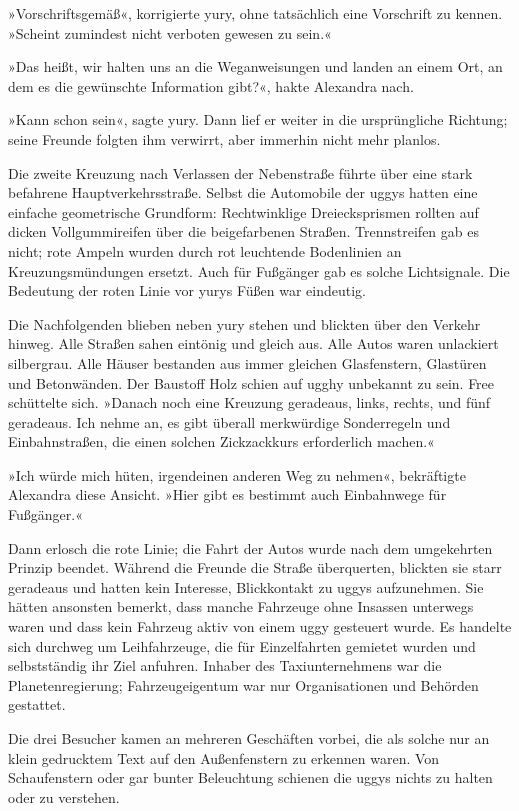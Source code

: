 »Vorschriftsgemäß«, korrigierte yury, ohne tatsächlich eine Vorschrift zu kennen. »Scheint zumindest nicht verboten gewesen zu sein.«

»Das heißt, wir halten uns an die Weganweisungen und landen an einem Ort, an dem es die gewünschte Information gibt?«, hakte Alexandra nach.

»Kann schon sein«, sagte yury. Dann lief er weiter in die ursprüngliche Richtung; seine Freunde folgten ihm verwirrt, aber immerhin nicht mehr planlos.

Die zweite Kreuzung nach Verlassen der Nebenstraße führte über eine stark befahrene Hauptverkehrsstraße. Selbst die Automobile der uggys hatten eine einfache geometrische Grundform: Rechtwinklige Dreiecksprismen rollten auf dicken Vollgummireifen über die beigefarbenen Straßen. Trennstreifen gab es nicht; rote Ampeln wurden durch rot leuchtende Bodenlinien an Kreuzungsmündungen ersetzt. Auch für Fußgänger gab es solche Lichtsignale. Die Bedeutung der roten Linie vor yurys Füßen war eindeutig.

Die Nachfolgenden blieben neben yury stehen und blickten über den Verkehr hinweg. Alle Straßen sahen eintönig und gleich aus. Alle Autos waren unlackiert silbergrau. Alle Häuser bestanden aus immer gleichen Glasfenstern, Glastüren und Betonwänden. Der Baustoff Holz schien auf ugghy unbekannt zu sein. Free schüttelte sich. »Danach noch eine Kreuzung geradeaus, links, rechts, und fünf geradeaus. Ich nehme an, es gibt überall merkwürdige Sonderregeln und Einbahnstraßen, die einen solchen Zickzackkurs erforderlich machen.«

»Ich würde mich hüten, irgendeinen anderen Weg zu nehmen«, bekräftigte Alexandra diese Ansicht. »Hier gibt es bestimmt auch Einbahnwege für Fußgänger.«

Dann erlosch die rote Linie; die Fahrt der Autos wurde nach dem umgekehrten Prinzip beendet. Während die Freunde die Straße überquerten, blickten sie starr geradeaus und hatten kein Interesse, Blickkontakt zu uggys aufzunehmen. Sie hätten ansonsten bemerkt, dass manche Fahrzeuge ohne Insassen unterwegs waren und dass kein Fahrzeug aktiv von einem uggy gesteuert wurde. Es handelte sich durchweg um Leihfahrzeuge, die für Einzelfahrten gemietet wurden und selbstständig ihr Ziel anfuhren. Inhaber des Taxiunternehmens war die Planetenregierung; Fahrzeugeigentum war nur Organisationen und Behörden gestattet.

Die drei Besucher kamen an mehreren Geschäften vorbei, die als solche nur an klein gedrucktem Text auf den Außenfenstern zu erkennen waren. Von Schaufenstern oder gar bunter Beleuchtung schienen die uggys nichts zu halten oder zu verstehen.

